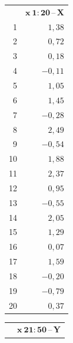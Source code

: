 \documentclass[a4paper, 11pt]{article}
\begin{document}
	\begin{table}[H]
		\begin{tabular}[t]{r|r|}
			\multicolumn{1}{c}{} & \multicolumn{1}{c}{$ \boldsymbol{x\ 1:20}
			$\,--\,$\boldsymbol{X} $} \\ \cline{2-2}

			1 & $ 1,38 $ \\ \cline{2-2}
			2 & $ 0,72 $ \\ \cline{2-2}
			3 & $ 0,18 $ \\ \cline{2-2}
			4 & $ -0,11 $ \\ \cline{2-2}
			5 & $ 1,05 $ \\ \cline{2-2}
			6 & $ 1,45 $ \\ \cline{2-2}
			7 & $ -0,28 $ \\ \cline{2-2}
			8 & $ 2,49 $ \\ \cline{2-2}
			9 & $ -0,54 $ \\ \cline{2-2}
			10 & $ 1,88 $ \\ \cline{2-2}
			11 & $ 2,37 $ \\ \cline{2-2}
			12 & $ 0,95 $ \\ \cline{2-2}
			13 & $ -0,55 $ \\ \cline{2-2}
			14 & $ 2,05 $ \\ \cline{2-2}
			15 & $ 1,29 $ \\ \cline{2-2}
			16 & $ 0,07 $ \\ \cline{2-2}
			17 & $ 1,59 $ \\ \cline{2-2}
			18 & $ -0,20 $ \\ \cline{2-2}
			19 & $ -0,79 $\\ \cline{2-2}
			20 & $ 0,37 $ \\ \cline{2-2}
		\end{tabular}
%
		\hspace{4em}
%
		\begin{tabular}[t]{r|r|}
			\multicolumn{1}{c}{} & \multicolumn{1}{c}{$ \boldsymbol{x\ 21:50}
			$\,--\,$ \boldsymbol{Y} $} \\ \cline{2-2}


\end{tabular}
\end{table}
\end{document}
